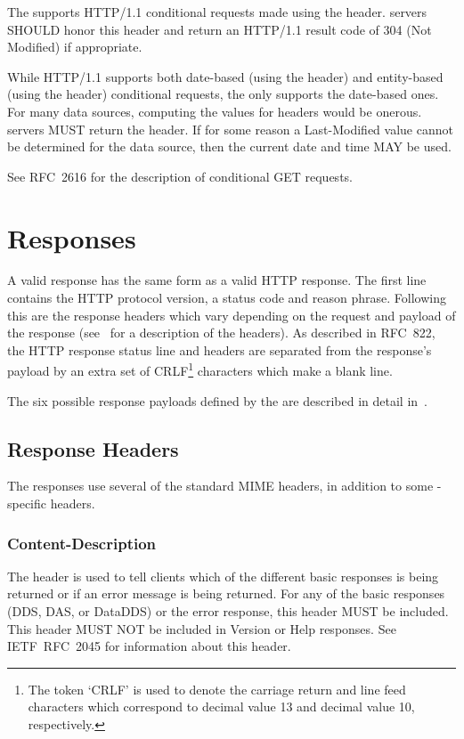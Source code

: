 \documentclass[justify]{nasa-ese}
\begin{document}
The \DAP supports HTTP/1.1 conditional requests made using the
 header. \DAP servers SHOULD honor this header
and return an HTTP/1.1 result code of 304 (Not Modified) if
appropriate. 

While HTTP/1.1 supports both date-based (using the 
header) and entity-based (using the  header) conditional
requests, the \DAP only supports the date-based ones. For many data
sources, computing the values for  headers would be onerous.
\DAP servers MUST return the  header. If for some
reason a Last-Modified value cannot be determined for the data source,
then the current date and time MAY be used.

See RFC~2616\cite{rfc2616} for the description of
conditional GET requests.

\section{Responses}
\label{sec-responses}

A valid \DAP response has the same form as a valid \ac{HTTP} response. The
first line contains the \ac{HTTP} protocol version, a status code and reason
phrase\cite{rfc2616}. Following this are the response headers which vary
depending on the request and payload of the response
(see~ for a description of the headers). As
described in RFC~822\cite{rfc822}, the \ac{HTTP} response status line and
headers are separated from the response's payload by an extra set of
CRLF\footnote{The token `CRLF' is used to denote the carriage return and
  line feed characters which correspond to decimal value 13 and decimal value
  10, respectively.} characters which make a blank line.

The six possible response payloads defined by the \DAP are described
in detail in~.

\subsection{Response Headers}
\label{sec-resp-headers}

The \DAP responses use several of the standard MIME headers, in
addition to some \DAP-specific headers.

\subsubsection{Content-Description}
The  header is used to tell clients which of the
different basic responses is being returned or if an error message is being
returned. For any of the basic responses (\ac{DDS}, \ac{DAS}, or
\ac{DataDDS}) or the error response, this header MUST be included. This
header MUST NOT be included in Version or Help responses. See
IETF~RFC~2045\cite{rfc2045} for information about this header.
\end{document}
